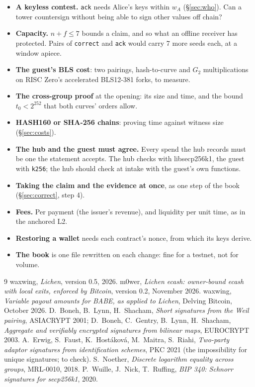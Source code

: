 \documentclass[11pt]{article}
\theoremstyle{plain}
\theoremstyle{definition}
\newcommand{\tx}[1]{\texttt{#1}}
\begin{document}
\begin{itemize}[nosep]
\item \textbf{A keyless contest.} \tx{ack} needs Alice's keys within
  $w_A$ (\S\ref{sec:who}). Can a tower countersign without being able
  to sign other values off chain?
\item \textbf{Capacity.} $n + f \le 7$ bounds a claim, and so what an
  offline receiver has protected. Pairs of \tx{correct} and \tx{ack}
  would carry 7 more seeds each, at a window apiece.
\item \textbf{The guest's BLS cost}: two pairings, hash-to-curve and
  $G_2$ multiplications on RISC Zero's accelerated BLS12-381 forks, to
  measure.
\item \textbf{The cross-group proof} at the opening: its size and time,
  and the bound $t_0 < 2^{252}$ that both curves' orders allow.
\item \textbf{HASH160 or SHA-256 chains}: proving time against witness
  size (\S\ref{sec:costs}).
\item \textbf{The hub and the guest must agree.} Every spend the hub
  records must be one the statement accepts. The hub checks with
  libsecp256k1, the guest with \tx{k256}; the hub should check at intake
  with the guest's own functions.
\item \textbf{Taking the claim and the evidence at once}, as one step
  of the book (\S\ref{sec:correct}, step 4).
\item \textbf{Fees.} Per payment (the issuer's revenue), and liquidity
  per unit time, as in the anchored L2.
\item \textbf{Restoring a wallet} needs each contract's nonce, from
  which its keys derive.
\item \textbf{The book} is one file rewritten on each change: fine for a
  testnet, not for volume.
\end{itemize}

\begin{thebibliography}{9}
 waxwing, \emph{Lichen}, version 0.5, 2026.
 m0wer, \emph{Lichen ecash: owner-bound ecash with local
  exits, enforced by Bitcoin}, version 0.2, November 2026.
 waxwing, \emph{Variable payout amounts for BABE, as
  applied to Lichen}, Delving Bitcoin, October 2026.
 D.~Boneh, B.~Lynn, H.~Shacham, \emph{Short signatures from
  the Weil pairing}, ASIACRYPT 2001; D.~Boneh, C.~Gentry, B.~Lynn,
  H.~Shacham, \emph{Aggregate and verifiably encrypted signatures from
  bilinear maps}, EUROCRYPT 2003.
 A.~Erwig, S.~Faust, K.~Hostáková, M.~Maitra, S.~Riahi,
  \emph{Two-party adaptor signatures from identification schemes}, PKC
  2021 (the impossibility for unique signatures; to check).
 S.~Noether, \emph{Discrete logarithm equality across
  groups}, MRL-0010, 2018.
 P.~Wuille, J.~Nick, T.~Ruffing, \emph{BIP 340: Schnorr
  signatures for secp256k1}, 2020.
\end{thebibliography}
\end{document}
